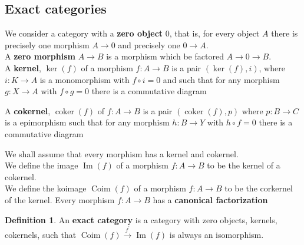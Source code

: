 \documentclass[5pt]{article}
\theoremstyle{definition}
\newtheorem{definition}[theorem]{Definition}
\theoremstyle{remark}
\DeclareMathOperator{\coker}{coker}
\DeclareMathOperator{\Img}{Im}
\DeclareMathOperator{\Coimg}{Coim}
\begin{document}
	\subsection{Exact categories}
	We consider a category with a \textbf{zero object} $0$, that is, for every object $A$ there is precisely one morphism $A \rightarrow 0$ and precisely one $0 \rightarrow A$. \\
	A \textbf{zero morphism} $A \rightarrow B$ is a morphism which be factored $A \rightarrow 0 \rightarrow B$. \\
	A \textbf{kernel}, $\ker(f)$ of a morphism $f: A \rightarrow B$ is a pair $(\ker(f),i)$, where $i: K \rightarrow A$ is a monomorphism with $f \circ i=0$ and such that for any morphism $g: X \rightarrow A$ with $f \circ g = 0$ there is a commutative diagram
	\begin{center}
	\end{center} 
	A \textbf{cokernel}, $\coker(f)$ of $f: A \rightarrow B$ is a pair $(\coker(f),p)$ where $p:B \rightarrow C$ is a epimorphism such that for any morphism $h: B \rightarrow Y$ with $h \circ f =0$ there is a commutative diagram
	\begin{center}
	\end{center}
	We shall assume that every morphism has a kernel and cokernel. \\
	We define the image $\Img (f)$ of a morphism $f:A \rightarrow B$ to be the kernel of a cokernel. \\
	We define the koimage $\Coimg(f)$ of a morphism $f: A \rightarrow B$ to be the corkernel of the kernel.
	Every morphism $f: A \rightarrow B$ has a \textbf{canonical factorization}
	\begin{center}
	\end{center}
	\begin{definition}
		An \textbf{exact category} is a category with zero objects, kernels, cokernels, such that $\Coimg(f) \xrightarrow{f^{'}} \Img(f)$ is always an isomorphism.
	\end{definition}
\end{document}
